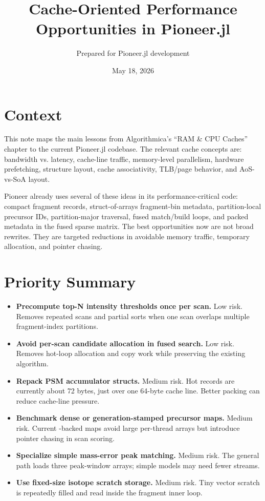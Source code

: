 \documentclass[11pt]{article}
\title{Cache-Oriented Performance Opportunities in Pioneer.jl}
\author{Prepared for Pioneer.jl development}
\date{May 18, 2026}
\begin{document}
\maketitle

\section*{Context}

This note maps the main lessons from Algorithmica's ``RAM \& CPU Caches''
chapter to the current Pioneer.jl codebase. The relevant cache concepts are:
bandwidth vs. latency, cache-line traffic, memory-level parallelism, hardware
prefetching, structure layout, cache associativity, TLB/page behavior, and
AoS-vs-SoA layout.

Pioneer already uses several of these ideas in its performance-critical code:
compact fragment records, struct-of-arrays fragment-bin metadata, partition-local
 precursor IDs, partition-major traversal, fused match/build loops,
and packed metadata in the fused sparse matrix. The best opportunities now are
not broad rewrites. They are targeted reductions in avoidable memory traffic,
temporary allocation, and pointer chasing.

\section*{Priority Summary}

\begin{itemize}
  \item \textbf{Precompute top-N intensity thresholds once per scan.}
        Low risk. Removes repeated scans and partial sorts when one scan
        overlaps multiple fragment-index partitions.
  \item \textbf{Avoid per-scan candidate allocation in fused search.}
        Low risk. Removes hot-loop allocation and copy work while preserving the
        existing algorithm.
  \item \textbf{Repack PSM accumulator structs.}
        Medium risk. Hot records are currently about 72 bytes, just over one
        64-byte cache line. Better packing can reduce cache-line pressure.
  \item \textbf{Benchmark dense or generation-stamped precursor maps.}
        Medium risk. Current -backed maps avoid large per-thread
        arrays but introduce pointer chasing in scan scoring.
  \item \textbf{Specialize simple mass-error peak matching.}
        Medium risk. The general path loads three peak-window arrays; simple
        models may need fewer streams.
  \item \textbf{Use fixed-size isotope scratch storage.}
        Medium risk. Tiny vector scratch is repeatedly filled and read inside
        the fragment inner loop.
\end{itemize}
\end{document}
